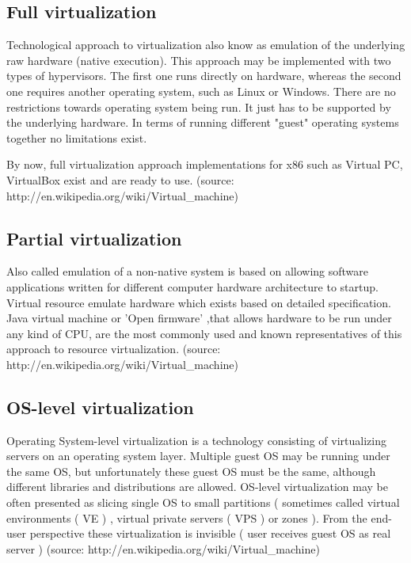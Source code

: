 \documentclass[11pt]{book}
\begin{document}
      \subsection{Full virtualization}

	Technological approach to virtualization also know as emulation of the underlying raw hardware (native execution). This approach
	may be implemented with two types of hypervisors. The first one runs directly on hardware, whereas the second one requires 
	another operating system, such as Linux or Windows. There are no restrictions towards operating system being run. It just has to 
	be supported by the underlying hardware. In terms of running different "guest" operating systems together no limitations exist.

	By now, full virtualization approach implementations for x86 such as Virtual PC, VirtualBox exist and are ready to 
	use.  (source: http://en.wikipedia.org/wiki/Virtual\_machine)

      \subsection{Partial virtualization}

	Also called emulation of a non-native system is based on allowing software applications written for different computer 
	hardware architecture to startup. Virtual resource emulate hardware which exists based on detailed specification. 
	Java virtual machine or 'Open firmware' ,that allows hardware to be run under any kind of CPU, are the most commonly
	used and known representatives of this approach to resource virtualization. (source: http://en.wikipedia.org/wiki/Virtual\_machine)

      \subsection{OS-level virtualization}

	Operating System-level virtualization is a technology consisting of virtualizing servers on an operating system layer. 
	Multiple guest OS may be running under the same OS, but unfortunately these guest OS must be the same, although
	different libraries and distributions are allowed. OS-level virtualization may be often presented as slicing single OS to small partitions ( 
	sometimes called virtual environments ( VE ) , virtual private servers ( VPS )  or zones ). From the end-user perspective these virtualization
	is invisible ( user receives guest OS as real server ) (source: http://en.wikipedia.org/wiki/Virtual\_machine)
\end{document}
